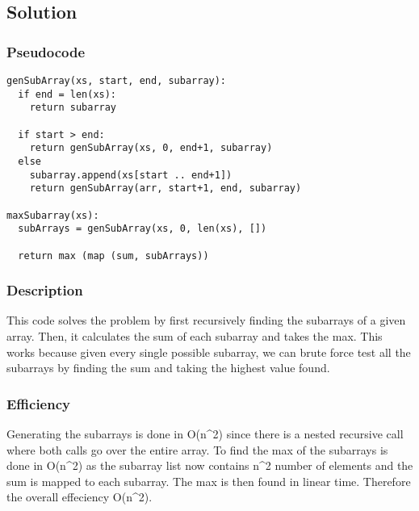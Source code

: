 \subsection*{Solution}

\subsubsection*{Pseudocode}
\begin{verbatim}
genSubArray(xs, start, end, subarray):
  if end = len(xs):
    return subarray

  if start > end:
    return genSubArray(xs, 0, end+1, subarray)
  else
    subarray.append(xs[start .. end+1])
    return genSubArray(arr, start+1, end, subarray)

maxSubarray(xs):
  subArrays = genSubArray(xs, 0, len(xs), [])

  return max (map (sum, subArrays))
\end{verbatim}

\subsubsection*{Description}
This code solves the problem by first recursively finding the subarrays of a given array. Then, it calculates the sum of each subarray and takes the max. This works because given every single possible subarray, we can brute force test all the subarrays by finding the sum and taking the highest value found.

\subsubsection*{Efficiency}
Generating the subarrays is done in O(n^2) since there is a nested recursive call where both calls go over the entire array. To find the max of the subarrays is done in O(n^2) as the subarray list now contains n^2 number of elements and the sum is mapped to each subarray. The max is then found in linear time. Therefore the overall effeciency O(n^2).
